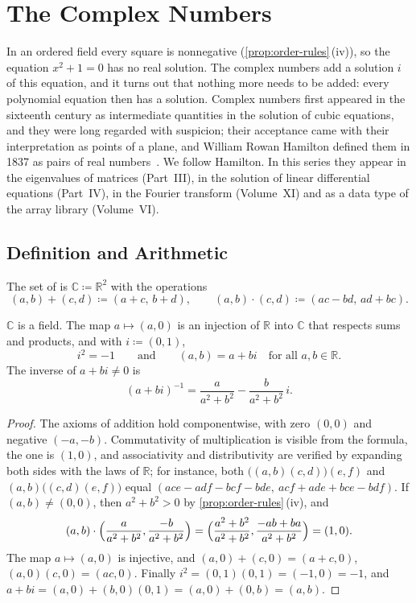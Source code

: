 \section{The Complex Numbers}
\label{sec:complex}

In an ordered field every square is nonnegative (\cref{prop:order-rules}\,(iv)), so the equation $x^2+1=0$ has no real solution. The complex numbers add a solution $i$ of this equation, and it turns out that nothing more needs to be added: every polynomial equation then has a solution. Complex numbers first appeared in the sixteenth century as intermediate quantities in the solution of cubic equations, and they were long regarded with suspicion; their acceptance came with their interpretation as points of a plane, and William Rowan Hamilton defined them in 1837 as pairs of real numbers~\cite{ebbinghaus1991}. We follow Hamilton. In this series they appear in the eigenvalues of matrices (Part~III), in the solution of linear differential equations (Part~IV), in the Fourier transform (Volume~XI) and as a data type of the array library (Volume~VI).

\subsection{Definition and Arithmetic}

\begin{definition}
\label{def:complex}
The set of  is $\mathbb C\coloneqq\mathbb R^2$ with the operations
\[
(a,b)+(c,d)\coloneqq(a+c,\,b+d),\qquad(a,b)\cdot(c,d)\coloneqq(ac-bd,\,ad+bc).
\]
\end{definition}

\begin{theorem}
\label{thm:c-field}
$\mathbb C$ is a field. The map $a\mapsto(a,0)$ is an injection of $\mathbb R$ into $\mathbb C$ that respects sums and products, and with $i\coloneqq(0,1)$,
\[
i^2=-1\qquad\text{and}\qquad(a,b)=a+bi\quad\text{for all }a,b\in\mathbb R .
\]
The inverse of $a+bi\ne0$ is
\[
(a+bi)^{-1}=\frac{a}{a^2+b^2}-\frac{b}{a^2+b^2}\,i .
\]
\end{theorem}

\begin{proof}
The axioms of addition hold componentwise, with zero $(0,0)$ and negative $(-a,-b)$. Commutativity of multiplication is visible from the formula, the one is $(1,0)$, and associativity and distributivity are verified by expanding both sides with the laws of $\mathbb R$; for instance, both $\bigl((a,b)(c,d)\bigr)(e,f)$ and $(a,b)\bigl((c,d)(e,f)\bigr)$ equal $(ace-adf-bcf-bde,\ acf+ade+bce-bdf)$. If $(a,b)\ne(0,0)$, then $a^2+b^2>0$ by \cref{prop:order-rules}\,(iv), and
\[
(a,b)\cdot\Bigl(\frac a{a^2+b^2},\frac{-b}{a^2+b^2}\Bigr)=\Bigl(\frac{a^2+b^2}{a^2+b^2},\frac{-ab+ba}{a^2+b^2}\Bigr)=(1,0).
\]
The map $a\mapsto(a,0)$ is injective, and $(a,0)+(c,0)=(a+c,0)$, $(a,0)(c,0)=(ac,0)$. Finally $i^2=(0,1)(0,1)=(-1,0)=-1$, and $a+bi=(a,0)+(b,0)(0,1)=(a,0)+(0,b)=(a,b)$.
\end{proof}

